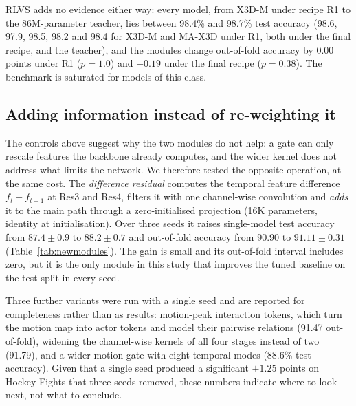 \documentclass[conference]{IEEEtran}
\begin{document}
RLVS adds no evidence either way: every model, from X3D-M under recipe R1
to the 86M-parameter teacher, lies between 98.4\% and 98.7\% test accuracy
(98.6, 97.9, 98.5, 98.2 and 98.4 for X3D-M and MA-X3D under R1, both
under the final recipe, and the teacher), and the modules change
out-of-fold accuracy by $0.00$ points under R1 ($p = 1.0$) and $-0.19$
under the final recipe ($p = 0.38$). The benchmark is saturated for models
of this class.


\subsection{Adding information instead of re-weighting it}
\label{sec:newmodules}

The controls above suggest why the two modules do not help: a gate can only rescale
features the backbone already computes, and the wider kernel does not address what
limits the network. We therefore tested the opposite operation, at the same cost. The
\emph{difference residual} computes the temporal feature difference
$f_t - f_{t-1}$ at Res3 and Res4, filters it with one channel-wise convolution and
\emph{adds} it to the main path through a zero-initialised projection (16K
parameters, identity at initialisation). Over three seeds it raises single-model test
accuracy from $87.4 \pm 0.9$ to $88.2 \pm 0.7$ and out-of-fold accuracy from 90.90 to
$91.11 \pm 0.31$ (Table~\ref{tab:newmodules}). The gain is small and its out-of-fold
interval includes zero, but it is the only module in this study that improves the
tuned baseline on the test split in every seed.

Three further variants were run with a single seed and are reported for completeness
rather than as results: motion-peak interaction tokens, which turn the motion map into
actor tokens and model their pairwise relations (91.47 out-of-fold), widening the
channel-wise kernels of all four stages instead of two (91.79), and a wider motion
gate with eight temporal modes (88.6\% test accuracy). Given that a single seed
produced a significant $+1.25$ points on Hockey Fights that three seeds removed, these
numbers indicate where to look next, not what to conclude.
\end{document}
